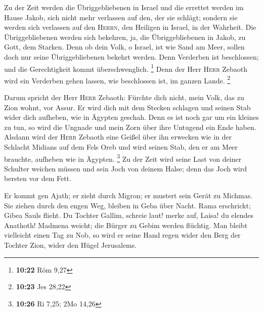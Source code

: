  Zu der Zeit werden die Übriggebliebenen in Israel und
die errettet werden im Hause Jakob, sich nicht mehr verlassen auf den,
der sie schlägt; sondern sie werden sich verlassen auf den
\textsc{Herrn}, den Heiligen in Israel, in der Wahrheit. 
Die Übriggebliebenen werden sich bekehren, ja, die Übriggebliebenen in
Jakob, zu Gott, dem Starken.  Denn ob dein Volk, o
Israel, ist wie Sand am Meer, sollen doch nur seine Übriggebliebenen
bekehrt werden. Denn Verderben ist beschlossen; und die Gerechtigkeit
kommt überschwenglich. \footnote{\textbf{10:22} Röm 9,27}
 Denn der Herr \textsc{Herr} Zebaoth wird ein Verderben
gehen lassen, wie beschlossen ist, im ganzen Lande. \footnote{\textbf{10:23}
  Jes 28,22}

 Darum spricht der Herr \textsc{Herr} Zebaoth: Fürchte
dich nicht, mein Volk, das zu Zion wohnt, vor Assur. Er wird dich mit
dem Stecken schlagen und seinen Stab wider dich aufheben, wie in Ägypten
geschah.  Denn es ist noch gar um ein kleines zu tun, so
wird die Ungnade und mein Zorn über ihre Untugend ein Ende haben.
 Alsdann wird der \textsc{Herr} Zebaoth eine Geißel über
ihn erwecken wie in der Schlacht Midians auf dem Fels Oreb und wird
seinen Stab, den er am Meer brauchte, aufheben wie in Ägypten.
\footnote{\textbf{10:26} Ri 7,25; 2Mo 14,26}  Zu der Zeit
wird seine Last von deiner Schulter weichen müssen und sein Joch von
deinem Halse; denn das Joch wird bersten vor dem Fett.

 Er kommt gen Ajath; er zieht durch Migron; er mustert
sein Gerät zu Michmas.  Sie ziehen durch den engen Weg,
bleiben in Geba über Nacht. Rama erschrickt; Gibea Sauls flieht.
 Du Tochter Gallim, schreie laut! merke auf, Laisa! du
elendes Anathoth!  Madmena weicht; die Bürger zu Gebim
werden flüchtig.  Man bleibt vielleicht einen Tag zu Nob,
so wird er seine Hand regen wider den Berg der Tochter Zion, wider den
Hügel Jerusalems.

